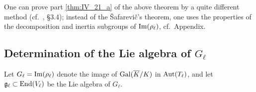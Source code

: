 \begin{obs}
One can prove part \ref{thm:IV_21_a} of the above theorem by a quite different
method (cf.\ \cite{25}, \S 3.4); instead of the \v Safarevi\v c's theorem, one
uses the properties of the decomposition and inertia subgroups of
$\operatorname{Im}(\rho_\ell)$, cf.\ Appendix.
\end{obs}

\subsection{Determination of the Lie algebra of \texorpdfstring{$G_\ell$}{Gℓ}}
\label{sec:IV_22}
Let $G_\ell = \operatorname{Im}(\rho_\ell)$ denote the image of $\operatorname{Gal}(\overline{K}/K)$ in
$\operatorname{Aut}(T_\ell)$, and let $\mathfrak{g}_\ell \subset \operatorname{End}(V_\ell)$ be the Lie
algebra of $G_\ell$.

